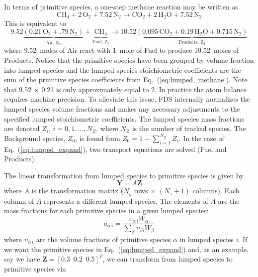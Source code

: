 In terms of primitive species, a one-step methane reaction may be written as
\begin{equation}\label{eq:lumped_methane}
\mbox{CH}_4 + 2\, \mbox{O}_2+7.52\,\mbox{N}_2 \rightarrow \mbox{CO}_2+2\,\mbox{H}_2\mbox{O}+7.52\,\mbox{N}_2
\end{equation}
This is equivalent to
\begin{equation}\label{eq:lumped_expand}
\mathrm{9.52\underbrace{(0.21\,\mbox{O}_2+.79\,\mbox{N}_2)}_\text{Air, $Z_0$}+\underbrace{\mbox{CH}_4}_\text{Fuel,~$Z_1$} \rightarrow 10.52\underbrace{(0.095\,\mbox{CO}_2+0.19\,\mbox{H}_2\mbox{O}+0.715\,\mbox{N}_2)}_\text{Products,~$Z_2$}}
\end{equation}
where 9.52~moles of Air react with 1~mole of Fuel to produce 10.52~moles of Products. Notice that the primitive species have been grouped by volume fraction into lumped species and the lumped species stoichiometric coefficients are the sum of the primitive species coefficients from Eq.~(\ref{eq:lumped_methane}). Note that 9.52 $\times$ 0.21 is only approximately equal to 2. In practice the atom balance requires machine precision. To alleviate this issue, FDS internally normalizes the lumped species volume fractions and makes any necessary adjustments to the specified lumped stoichiometric coefficients. The lumped species mass fractions are denoted $Z_i$, $i=0,1,...,N_Z$, where $N_Z$ is the number of tracked species.  The Background species, $Z_0$, is found from $Z_0=1-\sum_{i=1}^{N_{Z}} Z_i$. In the case of Eq.~(\ref{eq:lumped_expand}), two transport equations are solved (Fuel and Products).

The linear transformation from lumped species to primitive species is given by
\begin{equation}\label{eq:transform}
\textbf{Y}=A\textbf{Z}
\end{equation}
where $A$ is the transformation matrix ($N_{y}$ rows $\times$ $(N_{z}+1)$ columns).  Each column of $A$ represents a different lumped species.  The elements of $A$ are the mass fractions for each primitive species in a given lumped species:
\begin{equation}\label{eq:A_def}
a_{\alpha\,i} = \frac{\upsilon_{\alpha\,i}W_{\alpha}}{\displaystyle \sum_{\beta}\upsilon_{\beta i}W_{\beta}}
\end{equation}
where $\upsilon_{\alpha\,i}$ are the volume fractions of primitive species $\alpha$ in lumped species $i$. If we want the primitive species in Eq.~(\ref{eq:lumped_expand}) and, as an example, say we have $\mathbf{Z} = [0.3 \,\,\, 0.2 \,\,\, 0.5]^T$, we can transform from lumped species to primitive species via

